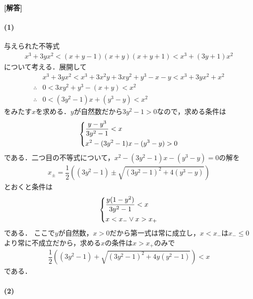 \documentclass[../../main.tex]{subfiles}
\begin{document}
\begin{oframed}
  
\end{oframed}

{\bf [解答]}

\paragraph{(1)}

与えられた不等式
\begin{align}
  x^3+3yx^2<(x+y-1)(x+y)(x+y+1)<x^3+(3y+1)x^2 \label{eq:1}
\end{align}
について考える．展開して
\begin{align}
  & x^3 + 3y x^2 < x^3 + 3x^2 y + 3x y^2 + y^3 - x - y < x^3 + 3y x^2 + x^2 \\
  \therefore
  & 0 < 3x y^2 + y^3 - (x+y) < x^2 \\
  \therefore
  & 0 < (3y^2-1)x + (y^3-y) < x^2  \label{eq:2}
\end{align}
をみたす$x$を求める．$y$が自然数だから$3y^2-1>0$なので，求める条件は
\begin{align}
  \begin{dcases}
    \dfrac{y-y^3}{3y^2-1} < x \\
    x^2 - (3y^2-1)x - (y^3-y) > 0
  \end{dcases}
\end{align}
である．二つ目の不等式について，$x^2 - (3y^2-1)x - (y^3-y)=0$の解を
\begin{align}
  x_{\pm} = \dfrac{1}{2} \left( (3y^2 - 1) \pm \sqrt{(3y^2 - 1)^2 + 4(y^3-y)} \right)
\end{align}
とおくと条件は
\begin{align}
  \begin{dcases}
    \dfrac{y(1-y^2)}{3y^2-1} < x \\
    x < x_{-} \lor x > x_{+}
  \end{dcases}
\end{align}
である．
ここで$y$が自然数，$x>0$だから第一式は常に成立し，$x<x_{-}$は$x_{-}\le 0$より常に不成立だから，求める$x$の条件は$x>x_{+}$のみで
\begin{align}
  \dfrac{1}{2} \left( (3y^2 - 1) + \sqrt{(3y^2 - 1)^2 + 4y(y^2 - 1)} \right) < x
\end{align}
である．

\paragraph{(2)}
\end{document}
